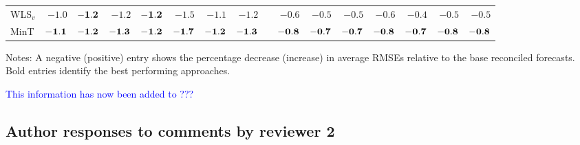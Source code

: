 \documentclass[10pt,a4paper]{article}
\begin{document}
\begin{enumerate}
\begin{table*}[!htb]
\begin{threeparttable}
\begin{tabular}{lrrrrrrrrrrrrrrr}
  WLS$_v$ & $-1.0$ & $\bf{ -1.2}$ & $-1.2$ & $\bf{ -1.2}$ & $-1.5$ & $-1.1$ & $-1.2$ & & $-0.6$ & $-0.5$ & $-0.5$ & $-0.6$ & $-0.4$ & $-0.5$ & $-0.5$ \\
  MinT & $\bf{ -1.1}$ & $\bf{ -1.2}$ & $\bf{ -1.3}$ & $\bf{ -1.2}$ & $\bf{ -1.7}$ & $\bf{ -1.2}$ & $\bf{ -1.3}$ & & $\bf{ -0.8}$ & $\bf{ -0.7}$ & $\bf{ -0.7}$ & $\bf{ -0.8}$ & $\bf{ -0.7}$ & $\bf{ -0.8}$ & $\bf{ -0.8}$ \\
  \bottomrule
  \end{tabular}
  \begin{tablenotes}
  \item Notes: A negative (positive) entry shows the percentage decrease (increase) in average RMSEs relative to the base reconciled forecasts. Bold entries identify the best performing approaches.
  \end{tablenotes}
  \end{threeparttable}
  \end{table*}

  \textcolor{blue}{This information has now been added to ???}
\end{enumerate}

\clearpage

\subsection*{Author responses to comments by reviewer 2}
\end{document}
